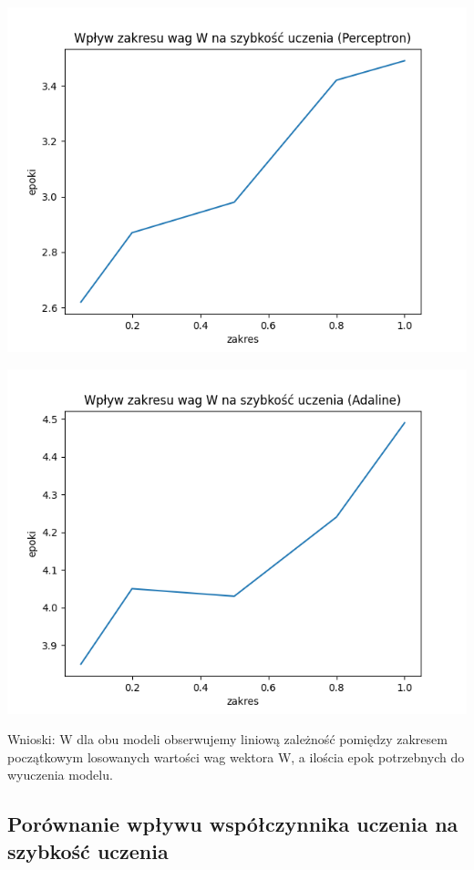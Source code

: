 \documentclass{article}
\begin{document}
\begin{center}
\includegraphics[scale=0.7]{per_exp2.png}
\end{center}
\begin{center}
\includegraphics[scale=0.7]{ada_exp1.png}
\end{center}
Wnioski: W dla obu modeli obserwujemy liniową zależność pomiędzy zakresem początkowym losowanych wartości wag wektora W, a ilościa epok potrzebnych do wyuczenia modelu.

\newpage
\subsection{Porównanie wpływu współczynnika uczenia na szybkość uczenia}
\end{document}
